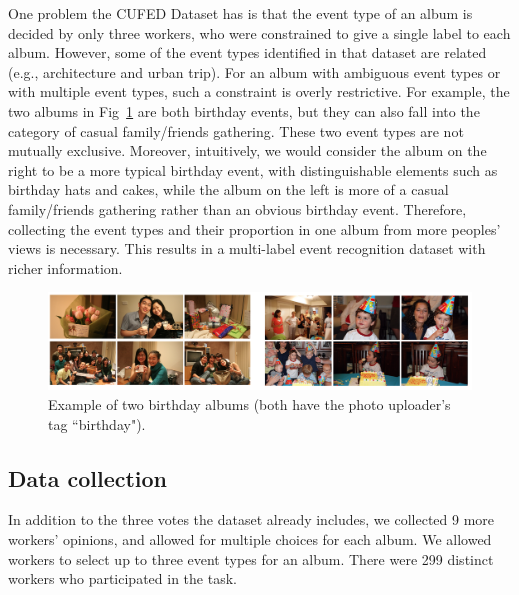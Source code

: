 \documentclass[runningheads]{llncs}
\begin{document}
One problem the CUFED Dataset has is that the event type of an album is decided by only three workers, who were constrained to give a single label to each album. However, some of the event types identified in that dataset are related (e.g., architecture and urban trip). For an album with ambiguous event types or with multiple event types, such a constraint is overly restrictive. For example, the two albums in Fig~\ref{album} are both birthday events, but they can also fall into the category of casual family/friends gathering. These two event types are not mutually exclusive. Moreover, intuitively, we would consider the album on the right to be a more typical birthday event, with distinguishable elements such as birthday hats and cakes, while the album on the left is more of a casual family/friends gathering rather than an obvious birthday event. Therefore, collecting the event types and their proportion in one album from more peoples' views is necessary. This results in a multi-label event recognition dataset with richer information. 
%
%
%
\begin{figure}
\vspace{-0.1in}
\centering
\includegraphics[width=4.5in]{album}
\caption{Example of two birthday albums (both have the photo uploader's tag ``birthday"). }
\label{album}
\vspace{-0.2in}
\end{figure}




\subsection{Data collection}
In addition to the three votes the dataset already includes, we collected 9 more workers' opinions, and allowed for multiple choices for each album. We allowed workers to select up to three event types for an album. There were  299 distinct workers who participated in the task.
\end{document}
